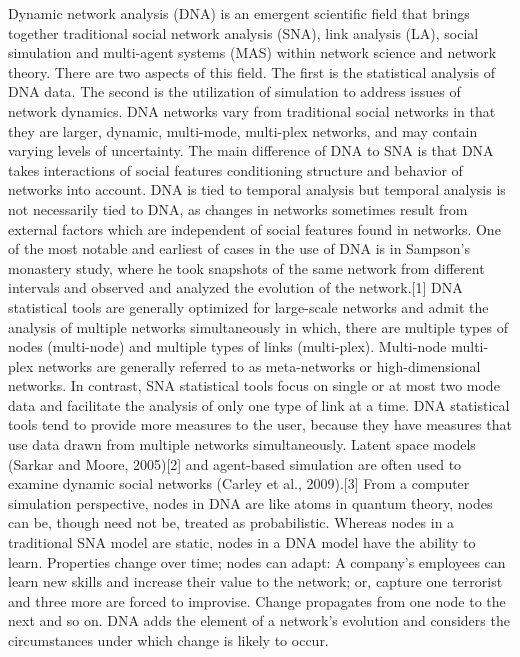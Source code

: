 Dynamic network analysis (DNA) is an emergent scientific field that brings together traditional social network analysis (SNA), link analysis (LA), social simulation and multi-agent systems (MAS) within network science and network theory. There are two aspects of this field. The first is the statistical analysis of DNA data. The second is the utilization of simulation to address issues of network dynamics. DNA networks vary from traditional social networks in that they are larger, dynamic, multi-mode, multi-plex networks, and may contain varying levels of uncertainty. The main difference of DNA to SNA is that DNA takes interactions of social features conditioning structure and behavior of networks into account. DNA is tied to temporal analysis but temporal analysis is not necessarily tied to DNA, as changes in networks sometimes result from external factors which are independent of social features found in networks. One of the most notable and earliest of cases in the use of DNA is in Sampson's monastery study, where he took snapshots of the same network from different intervals and observed and analyzed the evolution of the network.[1]
DNA statistical tools are generally optimized for large-scale networks and admit the analysis of multiple networks simultaneously in which, there are multiple types of nodes (multi-node) and multiple types of links (multi-plex). Multi-node multi-plex networks are generally referred to as meta-networks or high-dimensional networks. In contrast, SNA statistical tools focus on single or at most two mode data and facilitate the analysis of only one type of link at a time.
DNA statistical tools tend to provide more measures to the user, because they have measures that use data drawn from multiple networks simultaneously. Latent space models (Sarkar and Moore, 2005)[2] and agent-based simulation are often used to examine dynamic social networks (Carley et al., 2009).[3] From a computer simulation perspective, nodes in DNA are like atoms in quantum theory, nodes can be, though need not be, treated as probabilistic. Whereas nodes in a traditional SNA model are static, nodes in a DNA model have the ability to learn. Properties change over time; nodes can adapt: A company's employees can learn new skills and increase their value to the network; or, capture one terrorist and three more are forced to improvise. Change propagates from one node to the next and so on. DNA adds the element of a network's evolution and considers the circumstances under which change is likely to occur.

